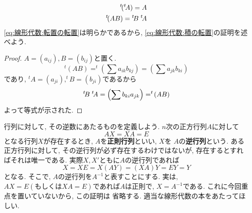         \begin{align}
            ^t\!(^t\!A)=A \label{eq:線形代数:転置の転置} \\
            ^t\!(AB) = {}^t\!B \hspace{1mm}{}^t\!A \label{eq:線形代数:積の転置}
        \end{align}
        \eqref{eq:線形代数:転置の転置}は明らかであるから, \eqref{eq:線形代数:積の転置}の証明を述べよう.
        \begin{proof}
            $A=(a_{ij}),B=(b_{ij})$と置く.
            \begin{equation*}
                ^t\!(AB)=^t\!\left(\sum a_{ik}b_{kj}\right)=\left(\sum a_{jk}b_{ki}\right)
            \end{equation*}
            であり, $^t\!A=(a_{ji}),^t\!B=(b_{ji})$であるから
            \begin{equation*}
                ^t\!B\hspace{1mm} ^t\! A = \left(\sum b_{ki}a_{jk}\right) = ^t\!(AB)
            \end{equation*}
            よって等式が示された.
        \end{proof}
        \clearpage
        行列に対して, その逆数にあたるものを定義しよう. $n$次の正方行列$A$に対して
        \begin{equation}
            AX=XA=E \label{eq:線形代数:逆行列の定義}
        \end{equation}
        となる行列$X$が存在するとき, $A$を\textbf{正則行列}といい, $X$を
        $A$の\textbf{逆行列}という. ある正方行列に対して, その逆行列が必ず存在するわけではないが, 
        存在するとすればそれは唯一である. 実際$X,X'$ともに$A$の逆行列であれば
        \begin{equation*}
            X=XE=X(AY)=(XA)Y=EY=Y
        \end{equation*} 
        となる. そこで, $A$の逆行列を$A^{-1}$と表すことにする. 実は, $AX=E(\text{もしくは}XA=E)$であれば$A$は正則で, $X=A^{-1}$である. これに今回重点を置いていないから, この証明は
        省略する. 適当な線形代数の本をあたってほしい.

